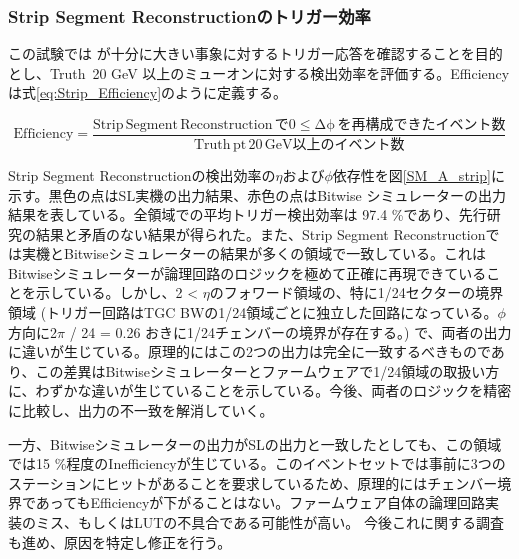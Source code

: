 \subsubsection*{Strip Segment Reconstructionのトリガー効率}
この試験では \pt  が十分に大きい事象に対するトリガー応答を確認することを目的とし、Truth \pt $\,$20 GeV 以上のミューオンに対する検出効率を評価する。Efficiencyは式\ref{eq:Strip_Efficiency}のように定義する。

\begin{equation}
    \mathrm {Efficiency} = \frac{\mathrm{Strip\,Segment \,Reconstruction\,で0\leq\Delta\phi\,を再構成できたイベント数}}{\mathrm{Truth\,pt \,20 \,GeV以上のイベント数}}
    \label{eq:Strip_Efficiency}
\end{equation}

Strip Segment Reconstructionの検出効率の$\eta$および$\phi$依存性を図\ref{SM_A_strip}に示す。黒色の点はSL実機の出力結果、赤色の点はBitwise シミュレーターの出力結果を表している。全領域での平均トリガー検出効率は 97.4 \%であり、先行研究\cite{mt_mino}の結果と矛盾のない結果が得られた。また、Strip Segment Reconstructionでは実機とBitwiseシミュレーターの結果が多くの領域で一致している。これはBitwiseシミュレーターが論理回路のロジックを極めて正確に再現できていることを示している。しかし、2 < $\eta$のフォワード領域の、特に1/24セクターの境界領域 (トリガー回路はTGC BWの1/24領域ごとに独立した回路になっている。$\phi$方向に2$\pi$ / 24 = 0.26 おきに1/24チェンバーの境界が存在する。) で、両者の出力に違いが生じている。原理的にはこの2つの出力は完全に一致するべきものであり、この差異はBitwiseシミュレーターとファームウェアで1/24領域の取扱い方に、わずかな違いが生じていることを示している。今後、両者のロジックを精密に比較し、出力の不一致を解消していく。

一方、Bitwiseシミュレーターの出力がSLの出力と一致したとしても、この領域では15 \%程度のInefficiencyが生じている。このイベントセットでは事前に3つのステーションにヒットがあることを要求しているため、原理的にはチェンバー境界であってもEfficiencyが下がることはない。ファームウェア自体の論理回路実装のミス、もしくはLUTの不具合である可能性が高い。
今後これに関する調査も進め、原因を特定し修正を行う。

